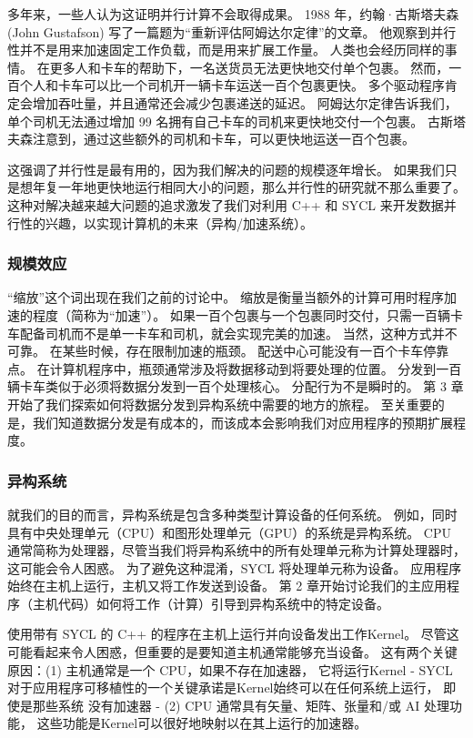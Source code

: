 多年来，一些人认为这证明并行计算不会取得成果。 
1988 年，约翰·古斯塔夫森 (John Gustafson) 写了一篇题为“重新评估阿姆达尔定律”的文章。 
他观察到并行性并不是用来加速固定工作负载，而是用来扩展工作量。 人类也会经历同样的事情。 
在更多人和卡车的帮助下，一名送货员无法更快地交付单个包裹。 
然而，一百个人和卡车可以比一个司机开一辆卡车运送一百个包裹更快。 
多个驱动程序肯定会增加吞吐量，并且通常还会减少包裹递送的延迟。 
阿姆达尔定律告诉我们，单个司机无法通过增加 99 名拥有自己卡车的司机来更快地交付一个包裹。 
古斯塔夫森注意到，通过这些额外的司机和卡车，可以更快地运送一百个包裹。

这强调了并行性是最有用的，因为我们解决的问题的规模逐年增长。 
如果我们只是想年复一年地更快地运行相同大小的问题，那么并行性的研究就不那么重要了。 
这种对解决越来越大问题的追求激发了我们对利用 C++ 和 SYCL 来开发数据并行性的兴趣，以实现计算机的未来（异构/加速系统）。

\subsubsection{规模效应}
“缩放”这个词出现在我们之前的讨论中。 缩放是衡量当额外的计算可用时程序加速的程度（简称为“加速”）。 
如果一百个包裹与一个包裹同时交付，只需一百辆卡车配备司机而不是单一卡车和司机，就会实现完美的加速。 
当然，这种方式并不可靠。 在某些时候，存在限制加速的瓶颈。 配送中心可能没有一百个卡车停靠点。 
在计算机程序中，瓶颈通常涉及将数据移动到将要处理的位置。 分发到一百辆卡车类似于必须将数据分发到一百个处理核心。 
分配行为不是瞬时的。 第 3 章开始了我们探索如何将数据分发到异构系统中需要的地方的旅程。 
至关重要的是，我们知道数据分发是有成本的，而该成本会影响我们对应用程序的预期扩展程度。

\subsubsection{异构系统}
就我们的目的而言，异构系统是包含多种类型计算设备的任何系统。 
例如，同时具有中央处理单元（CPU）和图形处理单元（GPU）的系统是异构系统。 
CPU 通常简称为处理器，尽管当我们将异构系统中的所有处理单元称为计算处理器时，这可能会令人困惑。 
为了避免这种混淆，SYCL 将处理单元称为设备。 应用程序始终在主机上运行，主机又将工作发送到设备。 
第 2 章开始讨论我们的主应用程序（主机代码）如何将工作（计算）引导到异构系统中的特定设备。

使用带有 SYCL 的 C++ 的程序在主机上运行并向设备发出工作Kernel。 
尽管这可能看起来令人困惑，但重要的是要知道主机通常能够充当设备。 
这有两个关键原因：(1) 主机通常是一个 CPU，如果不存在加速器，
它将运行Kernel - SYCL 对于应用程序可移植性的一个关键承诺是Kernel始终可以在任何系统上运行，
即使是那些系统 没有加速器 - (2) CPU 通常具有矢量、矩阵、张量和/或 AI 处理功能，
这些功能是Kernel可以很好地映射以在其上运行的加速器。

